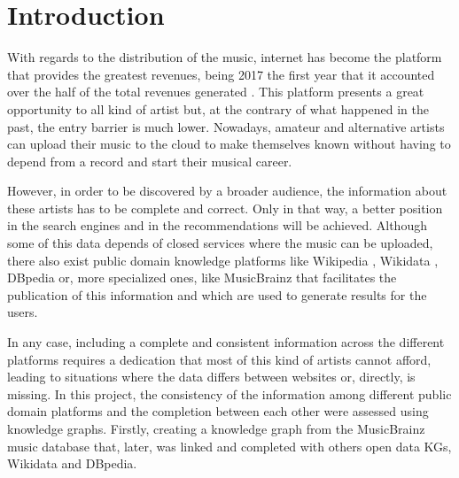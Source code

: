 \section{Introduction}
With regards to the distribution of the music, internet has become the platform that provides the greatest revenues, being 2017 the first year that it accounted over the half of the total revenues generated \citep{music_report_2018}.
This platform presents a great opportunity to all kind of artist but, at the contrary of what happened in the past, the entry barrier is much lower.
Nowadays, amateur and alternative artists can upload their music to the cloud to make themselves known without having to depend from a record and start their musical career. 

However, in order to be discovered by a broader audience, the information about these artists has to be complete and correct.
Only in that way, a better position in the search engines and in the recommendations will be achieved.
Although some of this data depends of closed services where the music can be uploaded, there also exist public domain knowledge platforms like Wikipedia \citep{wikipedia}, Wikidata \citep{wikidata}, DBpedia \citep{dbpedia} or, more specialized ones, like MusicBrainz \citep{musicbrainz} that facilitates the publication of this information and which are used to generate results for the users. 

In any case, including a complete and consistent information across the different platforms requires a dedication that most of this kind of artists cannot afford, leading to situations where the data differs between websites or, directly, is missing.
In this project, the consistency of the information among different public domain platforms and the completion between each other were assessed using knowledge graphs.
Firstly, creating a knowledge graph from the MusicBrainz music database that, later, was linked and completed with others open data KGs, Wikidata and DBpedia. 